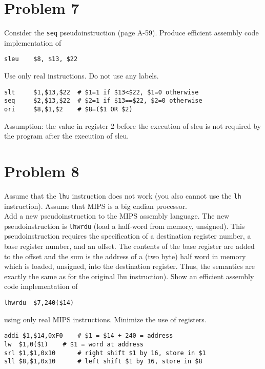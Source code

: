 \documentclass[10pt,letterpaper]{article}
\begin{document}

\section{Problem 7}
Consider the \texttt{seq} pseudoinstruction (page A-59). Produce efficient assembly code implementation of 
\begin{lstlisting}
sleu 	$8, $13, $22
\end{lstlisting}
Use only real instructions. Do not use any labels.
\begin{lstlisting}
slt 	$1,$13,$22 	# $1=1 if $13<$22, $1=0 otherwise
seq 	$2,$13,$22 	# $2=1 if $13==$22, $2=0 otherwise
ori 	$8,$1,$2 	# $8=($1 OR $2) 
\end{lstlisting}
Assumption: the value in register 2 before the execution of sleu is not required by the program after the execution of sleu.
\pagebreak


\section{Problem 8}
Assume that the \texttt{lhu} instruction does not work (you also cannot use the \texttt{lh} instruction). Assume that MIPS is a big endian processor.\\
Add a new pseudoinstruction to the MIPS assembly language. The new pseudoinstruction is \texttt{lhwrdu} (load a half-word from memory, unsigned). This pseudoinstruction requires the specification of a destination register number, a base register number, and an offset. The contents of the base register are added to the offset and the sum is the address of a (two byte) half word in memory which is loaded, unsigned, into the destination register. Thus, the semantics are 
exactly the same as for the original lhu instruction).
Show an efficient assembly code implementation of 
\begin{lstlisting}
lhwrdu 	$7,240($14)
\end{lstlisting}
using only real MIPS instructions. Minimize the use of registers.
\begin{lstlisting}
addi $1,$14,0xF0 	# $1 = $14 + 240 = address
lw 	$1,0($1) 	# $1 = word at address
srl $1,$1,0x10 		# right shift $1 by 16, store in $1
sll $8,$1,0x10 		# left shift $1 by 16, store in $8
\end{lstlisting}
\pagebreak

\end{document}

